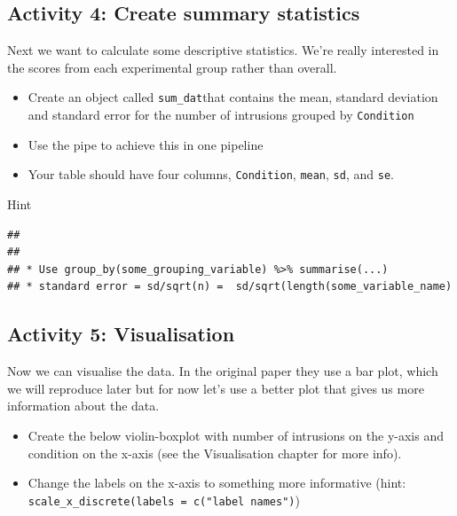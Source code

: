 \documentclass[]{book}
\providecommand{\tightlist}{%
  \setlength{\itemsep}{0pt}\setlength{\parskip}{0pt}}
\begin{document}
\hypertarget{activity-4-create-summary-statistics}{%
\subsection{Activity 4: Create summary statistics}\label{activity-4-create-summary-statistics}}

Next we want to calculate some descriptive statistics. We're really interested in the scores from each experimental group rather than overall.

\begin{itemize}
\tightlist
\item
  Create an object called \texttt{sum\_dat}that contains the mean, standard deviation and standard error for the number of intrusions grouped by \texttt{Condition}\\
\item
  Use the pipe to achieve this in one pipeline\\
\item
  Your table should have four columns, \texttt{Condition}, \texttt{mean}, \texttt{sd}, and \texttt{se}.
\end{itemize}

Hint

\begin{verbatim}
## 
## 
## * Use group_by(some_grouping_variable) %>% summarise(...)
## * standard error = sd/sqrt(n) =  sd/sqrt(length(some_variable_name)
\end{verbatim}

\hypertarget{activity-5-visualisation}{%
\subsection{Activity 5: Visualisation}\label{activity-5-visualisation}}

Now we can visualise the data. In the original paper they use a bar plot, which we will reproduce later but for now let's use a better plot that gives us more information about the data.

\begin{itemize}
\tightlist
\item
  Create the below violin-boxplot with number of intrusions on the y-axis and condition on the x-axis (see the Visualisation chapter for more info).
\item
  Change the labels on the x-axis to something more informative (hint: \texttt{scale\_x\_discrete(labels\ =\ c("label\ names")})
\end{itemize}
\end{document}
